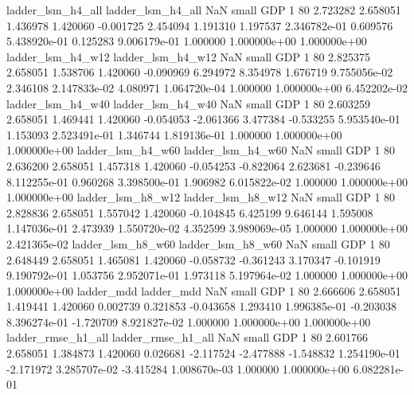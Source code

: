        ladder_lsm_h4_all        ladder_lsm_h4_all                   NaN      small      GDP                 1 80 2.723282       2.658051 1.436978       1.420060   -0.001725      2.454094      1.191310     1.197537   2.346782e-01  0.609576 5.438920e-01     0.125283   9.006179e-01            1.000000    1.000000e+00        1.000000e+00
       ladder_lsm_h4_w12        ladder_lsm_h4_w12                   NaN      small      GDP                 1 80 2.825375       2.658051 1.538706       1.420060   -0.090969      6.294972      8.354978     1.676719   9.755056e-02  2.346108 2.147833e-02     4.080971   1.064720e-04            1.000000    1.000000e+00        6.452202e-02
       ladder_lsm_h4_w40        ladder_lsm_h4_w40                   NaN      small      GDP                 1 80 2.603259       2.658051 1.469441       1.420060   -0.054053     -2.061366      3.477384    -0.533255   5.953540e-01  1.153093 2.523491e-01     1.346744   1.819136e-01            1.000000    1.000000e+00        1.000000e+00
       ladder_lsm_h4_w60        ladder_lsm_h4_w60                   NaN      small      GDP                 1 80 2.636200       2.658051 1.457318       1.420060   -0.054253     -0.822064      2.623681    -0.239646   8.112255e-01  0.960268 3.398500e-01     1.906982   6.015822e-02            1.000000    1.000000e+00        1.000000e+00
       ladder_lsm_h8_w12        ladder_lsm_h8_w12                   NaN      small      GDP                 1 80 2.828836       2.658051 1.557042       1.420060   -0.104845      6.425199      9.646144     1.595008   1.147036e-01  2.473939 1.550720e-02     4.352599   3.989069e-05            1.000000    1.000000e+00        2.421365e-02
       ladder_lsm_h8_w60        ladder_lsm_h8_w60                   NaN      small      GDP                 1 80 2.648449       2.658051 1.465081       1.420060   -0.058732     -0.361243      3.170347    -0.101919   9.190792e-01  1.053756 2.952071e-01     1.973118   5.197964e-02            1.000000    1.000000e+00        1.000000e+00
              ladder_mdd               ladder_mdd                   NaN      small      GDP                 1 80 2.666606       2.658051 1.419441       1.420060    0.002739      0.321853     -0.043658     1.293410   1.996385e-01 -0.203038 8.396274e-01    -1.720709   8.921827e-02            1.000000    1.000000e+00        1.000000e+00
      ladder_rmse_h1_all       ladder_rmse_h1_all                   NaN      small      GDP                 1 80 2.601766       2.658051 1.384873       1.420060    0.026681     -2.117524     -2.477888    -1.548832   1.254190e-01 -2.171972 3.285707e-02    -3.415284   1.008670e-03            1.000000    1.000000e+00        6.082281e-01
